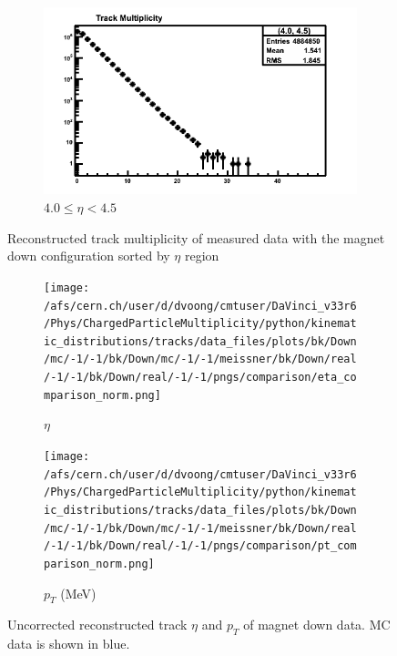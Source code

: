 \begin{figure}[h]
\begin{subfigure}[h]{0.32\textwidth}
		\includegraphics[width=\textwidth]{./Chapters/multiplicity/images/reconstructed_multiplicity_4_0_4_5_real_down.png}
		\caption{$4.0 \le \eta < 4.5$}
		\label{fig: reconstructed track multiplicity measured down 4.0 - 4.5}
	\end{subfigure}
	\caption{Reconstructed track multiplicity of measured data with the magnet down configuration sorted by $\eta$ region}
	\label{fig: reconstructed track multiplicity measured down}
\end{figure}

\begin{figure}[h]
	\begin{subfigure}[h]{0.49\textwidth}
		\texttt{[image: /afs/cern.ch/user/d/dvoong/cmtuser/DaVinci\_v33r6/Phys/ChargedParticleMultiplicity/python/kinematic\_distributions/tracks/data\_files/plots/bk/Down/mc/-1/-1/bk/Down/mc/-1/-1/meissner/bk/Down/real/-1/-1/bk/Down/real/-1/-1/pngs/comparison/eta\_comparison\_norm.png]}
		\caption{$\eta$}
		\label{fig: reconstructed eta mag down}
	\end{subfigure}
	\centering
	\begin{subfigure}[h]{0.49\textwidth}
		\texttt{[image: /afs/cern.ch/user/d/dvoong/cmtuser/DaVinci\_v33r6/Phys/ChargedParticleMultiplicity/python/kinematic\_distributions/tracks/data\_files/plots/bk/Down/mc/-1/-1/bk/Down/mc/-1/-1/meissner/bk/Down/real/-1/-1/bk/Down/real/-1/-1/pngs/comparison/pt\_comparison\_norm.png]}
		\caption{$p_T$ (MeV)}
		\label{fig: reconstructed pt mag down}
	\end{subfigure}
	\caption{Uncorrected reconstructed track $\eta$ and $p_T$ of magnet down data. MC data is shown in blue.}
	\label{fig: reconstructed track eta, phi, pt and p mag down}
\end{figure}
